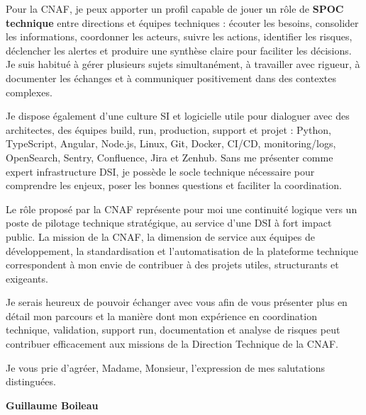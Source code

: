 \documentclass[11pt,a4paper]{altacv}
\begin{document}
{Pour la CNAF, je peux apporter un profil capable de jouer un rôle de \textbf{SPOC technique} entre directions et équipes techniques : écouter les besoins, consolider les informations, coordonner les acteurs, suivre les actions, identifier les risques, déclencher les alertes et produire une synthèse claire pour faciliter les décisions. Je suis habitué à gérer plusieurs sujets simultanément, à travailler avec rigueur, à documenter les échanges et à communiquer positivement dans des contextes complexes.

Je dispose également d'une culture SI et logicielle utile pour dialoguer avec des architectes, des équipes build, run, production, support et projet : Python, TypeScript, Angular, Node.js, Linux, Git, Docker, CI/CD, monitoring/logs, OpenSearch, Sentry, Confluence, Jira et Zenhub. Sans me présenter comme expert infrastructure DSI, je possède le socle technique nécessaire pour comprendre les enjeux, poser les bonnes questions et faciliter la coordination.

Le rôle proposé par la CNAF représente pour moi une continuité logique vers un poste de pilotage technique stratégique, au service d'une DSI à fort impact public. La mission de la CNAF, la dimension de service aux équipes de développement, la standardisation et l'automatisation de la plateforme technique correspondent à mon envie de contribuer à des projets utiles, structurants et exigeants.

Je serais heureux de pouvoir échanger avec vous afin de vous présenter plus en détail mon parcours et la manière dont mon expérience en coordination technique, validation, support run, documentation et analyse de risques peut contribuer efficacement aux missions de la Direction Technique de la CNAF.

Je vous prie d'agréer, Madame, Monsieur, l'expression de mes salutations distinguées.

\textbf{Guillaume Boileau}

}
\end{document}

